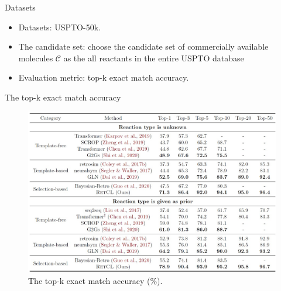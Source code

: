 \documentclass{beamer}		%
\begin{document}
\begin{frame}{Datasets}

\begin{itemize}
    \item Datasets: USPTO-50k.
    \item The candidate set: choose the candidate set of commercially available molecules $\mathcal{C}$ as the all reactants in the entire USPTO database
    \item Evaluation metric: top-k exact match accuracy.
\end{itemize}
    
\end{frame}



\begin{frame}{The top-k exact match accuracy}

\begin{figure}[t]
\centerline{\includegraphics[width=0.9\linewidth]{figure2.jpg}}
\vspace{-10pt}
\caption{The top-k exact match accuracy (\%).}
\label{fig1}
\end{figure}
    
\end{frame}
\end{document}
